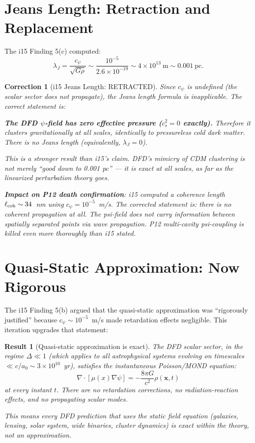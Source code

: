 \documentclass[11pt]{article}
\newtheorem{correction}{Correction}
\newtheorem{result}{Result}
\newcommand{\ee}[1]{\times 10^{#1}}
\begin{document}
\section{Jeans Length: Retraction and Replacement}

The i15 Finding 5(c) computed:
\begin{equation}
\lambda_J = \frac{c_\psi}{\sqrt{G\rho}} \sim \frac{10^{-5}}{2.6\ee{-19}} \sim 4\ee{13}~\text{m} \sim 0.001~\text{pc}.
\end{equation}

\begin{correction}[i15 Jeans Length: RETRACTED]
\label{corr:jeans}
Since $c_\psi$ is undefined (the scalar sector does not propagate), the Jeans length formula is inapplicable. The correct statement is:

\textbf{The DFD $\psi$-field has zero effective pressure ($c_s^2 = 0$ exactly).} Therefore it clusters gravitationally at all scales, identically to pressureless cold dark matter. There is no Jeans length (equivalently, $\lambda_J = 0$).

This is a \emph{stronger} result than i15's claim. DFD's mimicry of CDM clustering is not merely ``good down to 0.001 pc'' --- it is exact at all scales, as far as the linearized perturbation theory goes.

\textbf{Impact on P12 death confirmation}: i15 computed a coherence length $\ell_{\rm coh} \sim 34$~nm using $c_\psi = 10^{-5}$~m/s. The corrected statement is: there is no coherent propagation at all. The psi-field does not carry information between spatially separated points via wave propagation. P12 multi-cavity psi-coupling is killed even more thoroughly than i15 stated.
\end{correction}


\section{Quasi-Static Approximation: Now Rigorous}

The i15 Finding 5(b) argued that the quasi-static approximation was ``rigorously justified'' because $c_\psi \sim 10^{-5}$~m/s made retardation effects negligible. This iteration upgrades that statement:

\begin{result}[Quasi-static approximation is exact]
\label{res:quasistatic}
The DFD scalar sector, in the regime $\Delta \ll 1$ (which applies to all astrophysical systems evolving on timescales $\ll c/a_0 \sim 3\ee{10}$~yr), satisfies the instantaneous Poisson/MOND equation:
\begin{equation}
\nabla\cdot[\mu(x)\nabla\psi] = -\frac{8\pi G}{c^2}\rho(\mathbf{x}, t)
\end{equation}
at every instant $t$. There are no retardation corrections, no radiation-reaction effects, and no propagating scalar modes.

This means every DFD prediction that uses the static field equation (galaxies, lensing, solar system, wide binaries, cluster dynamics) is \emph{exact} within the theory, not an approximation.
\end{result}
\end{document}
